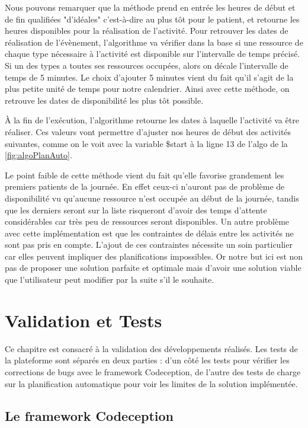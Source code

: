 \documentclass[noposter]{polytech/polytech}
\begin{document}
Nous pouvons remarquer que la méthode prend en entrée les heures de début et de fin qualifiées "d'idéales" c'est-à-dire au plus tôt pour le patient, et retourne les heures disponibles pour la réalisation de l'activité. Pour retrouver les dates de réalisation de l'évènement, l'algorithme va vérifier dans la base si une ressource de chaque type nécessaire à l'activité est disponible sur l'intervalle de temps précisé. Si un des types a toutes ses ressources occupées, alors on décale l'intervalle de temps de 5 minutes. Le choix d'ajouter 5 minutes vient du fait qu'il s'agit de la plus petite unité de temps pour notre calendrier. Ainsi avec cette méthode, on retrouve les dates de disponibilité les plus tôt possible. 

À la fin de l'exécution, l'algorithme retourne les dates à laquelle l'activité va être réaliser. Ces valeurs vont permettre d'ajuster nos heures de début des activités suivantes, comme on le voit avec la variable \$start à la ligne 13 de l'algo de la \autoref{fig:algoPlanAuto}.

Le point faible de cette méthode vient du fait qu'elle favorise grandement les premiers patients de la journée. En effet ceux-ci n'auront pas de problème de disponibilité vu qu'aucune ressource n'est occupée au début de la journée, tandis que les derniers seront sur la liste risqueront d'avoir des temps d'attente considérables car très peu de ressources seront disponibles. Un autre problème avec cette implémentation est que les contraintes de délais entre les activités ne sont pas pris en compte. L'ajout de ces contraintes nécessite un soin particulier car elles peuvent impliquer des planifications impossibles. Or notre but ici est non pas de proposer une solution parfaite et optimale mais d'avoir une solution viable que l'utilisateur peut modifier par la suite s'il le souhaite. 


\chapter{Validation et Tests}


Ce chapitre est consacré à la validation des développements réalisés. Les tests de la plateforme sont séparés en deux parties : d'un côté les tests pour vérifier les corrections de bugs avec le framework Codeception, de l'autre des tests de charge sur la planification automatique pour voir les limites de la solution implémentée. 

\section{Le framework Codeception}
\end{document}
